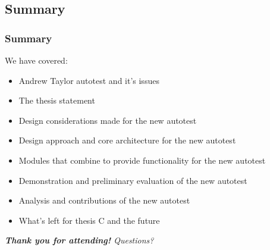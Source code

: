 \documentclass[xcolor, handout]{beamer}
\begin{document}
\subsection{Summary}
\begin{frame}
	\frametitle{Summary}
	We have covered:
	\begin{itemize}
		\setlength\itemsep{0.5em}
		\item Andrew Taylor autotest and it's issues
			\pause
		\item The thesis statement
			\pause
		\item Design considerations made for the new autotest
			\pause
		\item Design approach and core architecture for the new autotest
			\pause
		\item Modules that combine to provide functionality for the new autotest
			\pause
		\item Demonstration and preliminary evaluation of the new autotest
			\pause
		\item Analysis and contributions of the new autotest
			\pause
		\item What's left for thesis C and the future
			\pause
	\end{itemize}
	\textit{\textbf{Thank you for attending!} Questions?}
\end{frame}
\end{document}
